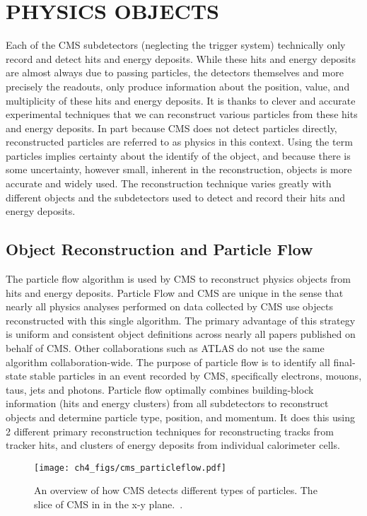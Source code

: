 %
%

\chapter{PHYSICS OBJECTS}
Each of the CMS subdetectors (neglecting the trigger system) technically only record and detect hits and energy deposits. While these hits and energy deposits are almost
always due to passing particles, the detectors themselves and more precisely the readouts, only produce information about the position, value, and multiplicity of
these hits and energy deposits. It is thanks to clever and accurate experimental techniques that we can reconstruct various particles from these hits and energy deposits.
In part because CMS does not detect particles directly, reconstructed particles are referred to as physics  in this context. Using
the term particles implies certainty about the identify of the object, and because there is some uncertainty, however small, inherent in the reconstruction, objects is
more accurate and widely used. The reconstruction technique varies greatly with different objects and the subdetectors used to detect and record their hits and energy
deposits. 

\section{Object Reconstruction and Particle Flow}
The particle flow algorithm is used by CMS to reconstruct physics objects from hits and energy deposits. Particle Flow and CMS are unique in the sense
that nearly all physics analyses performed on data collected by CMS use objects reconstructed with this single algorithm. The primary advantage of this strategy is
uniform and consistent object definitions across nearly all papers published on behalf of CMS. Other collaborations such as ATLAS do not use
the same algorithm collaboration-wide. The purpose of particle flow is to identify all final-state stable particles in an event recorded by CMS, specifically electrons,
mouons, taus, jets and photons. Particle flow optimally combines building-block information (hits and energy clusters) from all subdetectors to reconstruct objects and
determine particle type, position, and momentum. It does this using 2 different primary reconstruction techniques for reconstructing tracks from tracker hits, and clusters
of energy deposits from individual calorimeter cells. 

\begin{figure}[hbtp]
 \begin{center}
   \texttt{[image: ch4\_figs/cms\_particleflow.pdf]}
   \caption{An overview of how CMS detects different types of particles. The slice of CMS in in the x-y plane.~\cite{cms_pflow_img}.}
   \label{fig:cms_pflow}
 \end{center}
\end{figure}


